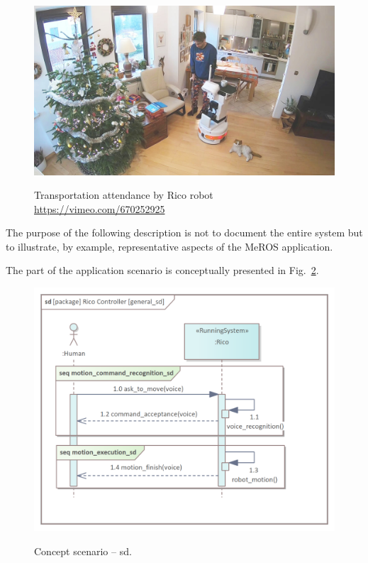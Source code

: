 \begin{figure}[H]
    \centering
    \begin{center}
    {\includegraphics[width=0.9\columnwidth]{../imgs/herbatka_u_winiara.jpg}}
    \end{center}
    \caption{Transportation attendance by Rico robot \url{https://vimeo.com/670252925}}
    \label{fig:herbatka_u_winiara}
\end{figure}



The purpose of the following description is not to document the entire system but to illustrate, by example, representative aspects of the MeROS application.

\pagebreak

The part of the application scenario is conceptually presented in Fig.~\ref{fig:general_sd}.


\begin{figure}[H]
    \centering
    \begin{center}
    {\includegraphics[scale=0.95]{../imgs/rico_pkg/general_sd.png}}
    \end{center}
    \caption{Concept scenario -- sd.}
    \label{fig:general_sd}
\end{figure}

